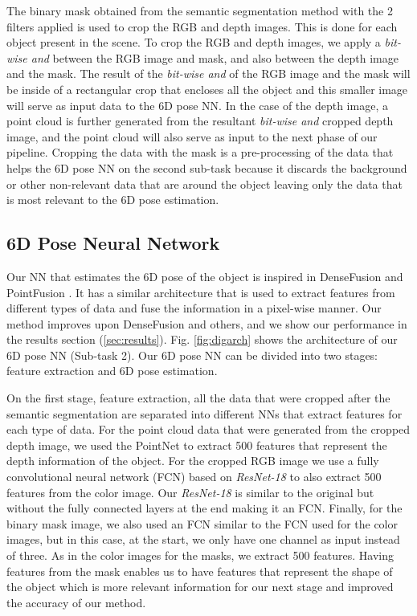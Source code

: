 \documentclass[runningheads]{llncs}
\begin{document}
The binary mask obtained from the semantic segmentation method with the 2 filters applied is used to crop the RGB and depth images. This is done for each object present in the scene.
To crop the RGB and depth images, we apply a \textit{bit-wise and} between the RGB image and mask, and also between the depth image and the mask.
The result of the \textit{bit-wise and} of the RGB image and the mask will be inside of a rectangular crop that encloses all the object and this smaller image will serve as input data to the 6D pose NN.
In the case of the depth image, a point cloud is further generated from the resultant \textit{bit-wise and} cropped depth image, and the point cloud will also serve as input to the next phase of our pipeline.
Cropping the data with the mask is a pre-processing of the data that helps the 6D pose NN on the second sub-task because it discards the background or other non-relevant data that are around the object leaving only the data that is most relevant to the 6D pose estimation.

\subsection{6D Pose Neural Network}
Our NN that estimates the 6D pose of the object is inspired in DenseFusion \cite{densefusion} and PointFusion \cite{pointfusion}.
It has a similar architecture that is used to extract features from different types of data and fuse the information in a pixel-wise manner.
Our method improves upon DenseFusion and others, and we show our performance in the results section (\ref{sec:results}).
Fig. \ref{fig:digarch} shows the architecture of our 6D pose NN (Sub-task 2).
Our 6D pose NN can be divided into two stages: feature extraction and 6D pose estimation.

On the first stage, feature extraction, all the data that were cropped after the semantic segmentation are separated into different NNs that extract features for each type of data.
For the point cloud data that were generated from the cropped depth image, we used the PointNet \cite{pointnet} to extract 500 features that represent the depth information of the object.
For the cropped RGB image we use a fully convolutional neural network (FCN) based on \textit{ResNet-18} to also extract 500 features from the color image.
Our \textit{ResNet-18} is similar to the original but without the fully connected layers at the end making it an FCN.
Finally, for the binary mask image, we also used an FCN similar to the FCN used for the color images, but in this case, at the start, we only have one channel as input instead of three.
As in the color images for the masks, we extract 500 features.
Having features from the mask enables us to have features that represent the shape of the object which is more relevant information for our next stage and improved the accuracy of our method.
\end{document}
